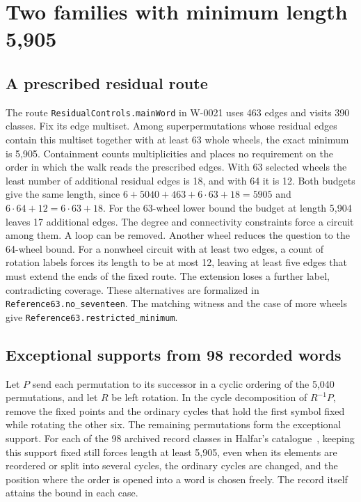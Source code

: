 \documentclass[11pt]{article}
\begin{document}
\section{Two families with minimum length 5,905}
\subsection{A prescribed residual route}
The route \texttt{ResidualControls.mainWord} in W-0021 uses 463 edges and visits 390 classes. Fix its edge multiset. Among
superpermutations whose residual edges contain this multiset together
with at least 63 whole wheels, the exact minimum is 5,905. Containment
counts multiplicities and places no requirement on the order in which
the walk reads the prescribed edges. With 63 selected wheels the least
number of additional residual edges is 18, and with 64 it is 12. Both budgets give the same length, since
$6+5040+463+6\cdot63+18=5905$ and $6\cdot64+12=6\cdot63+18$.
For the 63-wheel lower bound the budget at length 5,904 leaves 17
additional edges. The degree and connectivity constraints force a circuit
among them. A loop can be removed. Another wheel reduces the question to
the 64-wheel bound. For a nonwheel circuit with at least two edges, a count
of rotation labels forces its length to be at most 12, leaving at least
five edges that must extend the ends of the fixed route. The extension
loses a further label, contradicting coverage. These alternatives are
formalized in \texttt{Reference63.no\_seventeen}. The matching witness
and the case of more wheels give \texttt{Reference63.restricted\_minimum}.

\subsection{Exceptional supports from 98 recorded words}
Let $P$ send each permutation to its successor in a cyclic ordering of the 5,040 permutations, and let $R$ be left rotation. In the cycle decomposition of $R^{-1}P$, remove the fixed points and the ordinary cycles that hold the first symbol fixed while rotating the other six. The remaining permutations form the exceptional support. For each of the 98 archived record classes in Halfar's catalogue~\cite{ties}, keeping this support fixed still forces length at least 5,905, even when its elements are reordered or split into several cycles, the ordinary cycles are changed, and the position where the order is opened into a word is chosen freely. The record itself attains the bound in each case.
\end{document}

